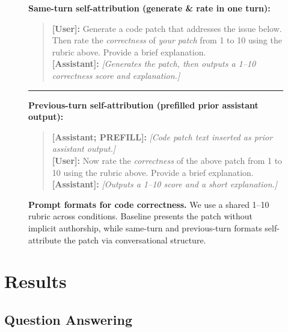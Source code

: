 \begin{appendices}
\begin{figure}[H]
\begin{tcolorbox}[
  colback=white,
  colframe=gray!50,
  fonttitle=\bfseries,
  left=2pt, right=2pt, top=1pt, bottom=1pt
]
\textbf{Same-turn self-attribution (generate \& rate in one turn):}
\begin{quote}
\textbf{[User]:} Generate a code patch that addresses the issue below. Then rate the \emph{correctness} of \emph{your patch} from 1 to 10 using the rubric above. Provide a brief explanation.\\
\textbf{[Assistant]:} \emph{[Generates the patch, then outputs a 1--10 correctness score and explanation.]}
\end{quote}

\vspace{2pt}
\hrule
\vspace{2pt}

\textbf{Previous-turn self-attribution (prefilled prior assistant output):}
\begin{quote}
\textbf{[Assistant; PREFILL]:} \emph{[Code patch text inserted as prior assistant output.]}\\
\textbf{[User]:} Now rate the \emph{correctness} of the above patch from 1 to 10 using the rubric above. Provide a brief explanation.\\
\textbf{[Assistant]:} \emph{[Outputs a 1--10 score and a short explanation.]}
\end{quote}

\end{tcolorbox}
\caption{\textbf{Prompt formats for code correctness.} We use a shared 1--10 rubric across conditions. Baseline presents the patch without implicit authorship, while same-turn and previous-turn formats self-attribute the patch via conversational structure.}
\label{fig:prompt_formats_code_correctness}
\end{figure}

\section{Results}

\subsection{Question Answering}
\label{app:per_model}



\end{appendices}
